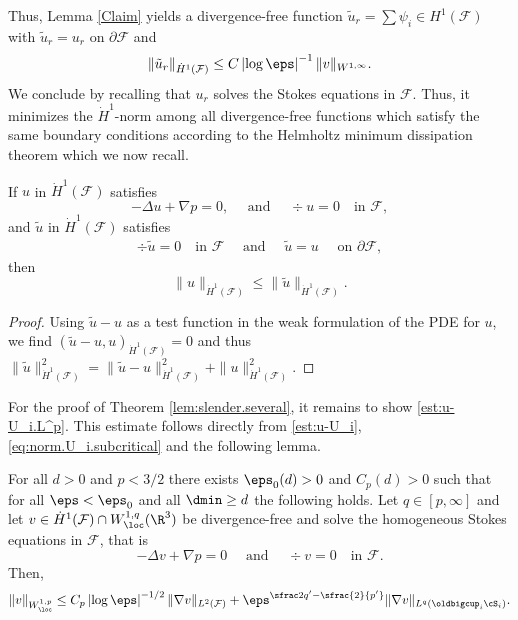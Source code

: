 Thus, Lemma \ref{Claim} yields a divergence-free function $\tilde u_r = \sum \psi_i \in H^1(\mathcal F)$ with $\tilde u_r = u_r$ on $\partial \mathcal F$ and
\begin{equation}
\|\tilde u_r \|_{\dot H^1(\mathcal F)} \leq C \left|\log \eps \right|^{-1} \|v\|_{W^{1,\infty}}.
\end{equation}
We conclude by recalling that $u_r$ solves the Stokes equations in $\mathcal F$. Thus, it minimizes the $\dot H^1$-norm among all divergence-free functions which satisfy the same boundary conditions according to the Helmholtz minimum dissipation theorem which we now recall.

\begin{thm}
\label{Helmholtz}
If $u $ in $\dot H^1({\mathcal F})$ satisfies
\begin{equation*}
- \Delta u + \nabla p = 0, \quad \text{ and }\quad \div u = 0 \quad \text{in } \mathcal F,
\end{equation*}
and $\tilde u $ in $\dot H^1({\mathcal F})$ satisfies
\begin{equation*}
\begin{aligned}
\div \tilde u = 0 \quad \text{in } \mathcal F \quad \text{ and }\quad
\tilde u = u \quad \text{ on } \partial \mathcal F,
\end{aligned}
\end{equation*}
then
\begin{equation*}
\|u\|_{\dot H^1({\mathcal F})}
\leq \|\tilde u\|_{\dot H^1({\mathcal F})}.
\end{equation*}
\end{thm}
\begin{proof}
Using $\tilde u - u$ as a test function in the weak formulation of the PDE for $u$, we find $(\tilde u - u,u)_{\dot H^1({\mathcal F})} =0$
and thus $\|\tilde u\|^2_{\dot H^1({\mathcal F})} = \|\tilde u - u\|^2_{\dot H^1({\mathcal F})} + \| u\|^2_{\dot H^1({\mathcal F})}$.
\end{proof}

For the proof of Theorem \ref{lem:slender.several}, it remains to show \eqref{est:u-U_i.L^p}. This estimate follows directly from \eqref{est:u-U_i}, \eqref{eq:norm.U_i.subcritical} and the following lemma.

\begin{Lemma}\label{lem:improved}
For all $d> 0$ and $p < 3/2$ there exists $\eps_0(d)>0$ and $C_p(d)>0$ such that for all $\eps < \eps_0$ and all $\dmin \geq d$ the following holds. Let $q \in [p,\infty]$ and let $v \in \dot H^1(\mathcal F) \cap W^{1,q}_{\loc}(\R^3)$ be divergence-free and solve the homogeneous Stokes equations in $\mathcal F$, that is
\begin{equation*}
- \Delta v + \nabla p = 0 \quad \text{ and } \quad \div v = 0 \quad \text{in } \mathcal F.
\end{equation*}
Then,
\begin{equation}
\|v\|_{W^{1,p}_\loc} \leq C_p \left|\log \eps\right|^{-1/2} \|\nabla v\|_{L^2(\mathcal F)} + \eps^{\sfrac 2 {q'} - \sfrac{2}{p'}} \|\nabla v\|_{L^q(\oldbigcup_i \cS_i)}.
\end{equation}
\end{Lemma}

